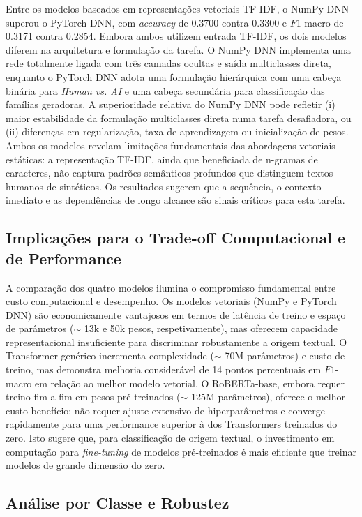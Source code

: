\documentclass[runningheads]{llncs}
\begin{document}
Entre os modelos baseados em representações vetoriais TF-IDF, o NumPy DNN superou o PyTorch DNN, com \textit{accuracy} de 0.3700 contra 0.3300 e \(F1\)-macro de 0.3171 contra 0.2854. Embora ambos utilizem entrada TF-IDF, os dois modelos diferem na arquitetura e formulação da tarefa. O NumPy DNN implementa uma rede totalmente ligada com três camadas ocultas e saída multiclasses direta, enquanto o PyTorch DNN adota uma formulação hierárquica com uma cabeça binária para \textit{Human vs. AI} e uma cabeça secundária para classificação das famílias geradoras. A superioridade relativa do NumPy DNN pode refletir (i) maior estabilidade da formulação multiclasses direta numa tarefa desafiadora, ou (ii) diferenças em regularização, taxa de aprendizagem ou inicialização de pesos. Ambos os modelos revelam limitações fundamentais das abordagens vetoriais estáticas: a representação TF-IDF, ainda que beneficiada de n-gramas de caracteres, não captura padrões semânticos profundos que distinguem textos humanos de sintéticos. Os resultados sugerem que a sequência, o contexto imediato e as dependências de longo alcance são sinais críticos para esta tarefa.

\subsection{Implicações para o Trade-off Computacional e de Performance}

A comparação dos quatro modelos ilumina o compromisso fundamental entre custo computacional e desempenho. Os modelos vetoriais (NumPy e PyTorch DNN) são economicamente vantajosos em termos de latência de treino e espaço de parâmetros ($\sim$ 13k e 50k pesos, respetivamente), mas oferecem capacidade representacional insuficiente para discriminar robustamente a origem textual. O Transformer genérico incrementa complexidade ($\sim$ 70M parâmetros) e custo de treino, mas demonstra melhoria considerável de 14 pontos percentuais em \(F1\)-macro em relação ao melhor modelo vetorial. O RoBERTa-base, embora requer treino fim-a-fim em pesos pré-treinados ($\sim$ 125M parâmetros), oferece o melhor custo-benefício: não requer ajuste extensivo de hiperparâmetros e converge rapidamente para uma performance superior à dos Transformers treinados do zero. Isto sugere que, para classificação de origem textual, o investimento em computação para \textit{fine-tuning} de modelos pré-treinados é mais eficiente que treinar modelos de grande dimensão do zero.

\subsection{Análise por Classe e Robustez}
\end{document}
